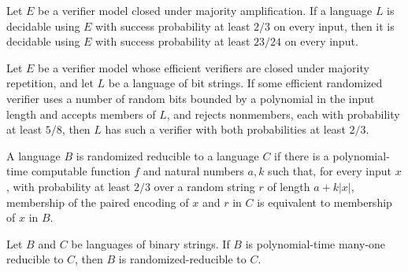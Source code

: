 \begin{theorem}
\label{Randomized.InBPP.inBPPAt_23_24}
\leanok
{}
Let $E$ be a verifier model closed under majority amplification. If a language $L$ is
decidable using $E$ with success probability at least $2/3$ on every input, then it is
decidable using $E$ with success probability at least $23/24$ on every input.
\end{theorem}

\begin{theorem}
\label{Randomized.InBPPAt.inBPP_of_5_8}
\leanok
{}
Let $E$ be a verifier model whose efficient verifiers are closed under majority
repetition, and let $L$ be a language of bit strings. If some efficient randomized
verifier uses a number of random bits bounded by a polynomial in the input length and
accepts members of $L$, and rejects nonmembers, each with probability at least $5/8$,
then $L$ has such a verifier with both probabilities at least $2/3$.
\end{theorem}

\begin{definition}
\label{Randomized.RandReducible}
\leanok
{}
A language $B$ is randomized reducible to a language $C$ if there is a polynomial-time
computable function $f$ and natural numbers $a,k$ such that, for every input $x$, with
probability at least $2/3$ over a random string $r$ of length $a+k|x|$, membership of
the paired encoding of $x$ and $r$ in $C$ is equivalent to membership of $x$ in $B$.
\end{definition}

\begin{theorem}
\label{Randomized.RandReducible.of_polyTimeReducible}
\leanok
{}
Let $B$ and $C$ be languages of binary strings. If $B$ is polynomial-time many-one
reducible to $C$, then $B$ is randomized-reducible to $C$.
\end{theorem}

